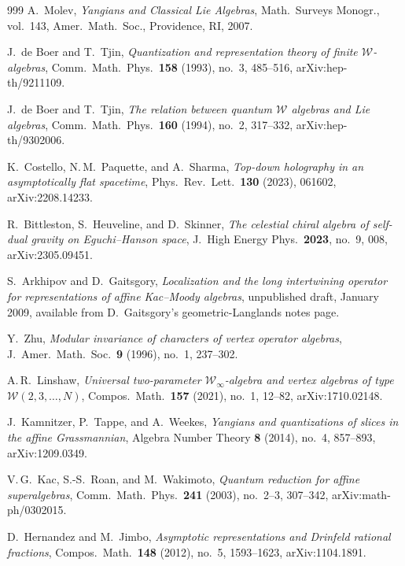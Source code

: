 \documentclass[11pt]{memoir}
\begin{document}
\begin{thebibliography}{999}
A.~Molev, \emph{Yangians and Classical Lie Algebras}, Math.\ Surveys Monogr., vol.~143, Amer.\ Math.\ Soc., Providence, RI, 2007.

J.~de Boer and T.~Tjin, \emph{Quantization and representation theory of finite $\mathcal{W}$-algebras}, Comm.\ Math.\ Phys.\ \textbf{158} (1993), no.~3, 485--516, arXiv:hep-th/9211109.

J.~de Boer and T.~Tjin, \emph{The relation between quantum $\mathcal{W}$ algebras and Lie algebras}, Comm.\ Math.\ Phys.\ \textbf{160} (1994), no.~2, 317--332, arXiv:hep-th/9302006.

K.~Costello, N.\,M.~Paquette, and A.~Sharma, \emph{Top-down holography in an asymptotically flat spacetime}, Phys.\ Rev.\ Lett.\ \textbf{130} (2023), 061602, arXiv:2208.14233.

R.~Bittleston, S.~Heuveline, and D.~Skinner, \emph{The celestial chiral algebra of self-dual gravity on Eguchi--Hanson space}, J.~High Energy Phys.\ \textbf{2023}, no.~9, 008, arXiv:2305.09451.

S.~Arkhipov and D.~Gaitsgory, \emph{Localization and the long intertwining operator for representations of affine Kac--Moody algebras}, unpublished draft, January 2009, available from D.~Gaitsgory's geometric-Langlands notes page.

Y.~Zhu, \emph{Modular invariance of characters of vertex operator algebras}, J.~Amer.\ Math.\ Soc.\ \textbf{9} (1996), no.~1, 237--302.

A.\,R.~Linshaw, \emph{Universal two-parameter $\mathcal{W}_\infty$-algebra and vertex algebras of type $\mathcal{W}(2,3,\ldots,N)$}, Compos.\ Math.\ \textbf{157} (2021), no.~1, 12--82, arXiv:1710.02148.

J.~Kamnitzer, P.~Tappe, and A.~Weekes, \emph{Yangians and quantizations of slices in the affine Grassmannian}, Algebra Number Theory \textbf{8} (2014), no.~4, 857--893, arXiv:1209.0349.

V.\,G.~Kac, S.-S.~Roan, and M.~Wakimoto, \emph{Quantum reduction for affine superalgebras}, Comm.\ Math.\ Phys.\ \textbf{241} (2003), no.~2--3, 307--342, arXiv:math-ph/0302015.

D.~Hernandez and M.~Jimbo, \emph{Asymptotic representations and Drinfeld rational fractions}, Compos.\ Math.\ \textbf{148} (2012), no.~5, 1593--1623, arXiv:1104.1891.


\end{thebibliography}
\end{document}
